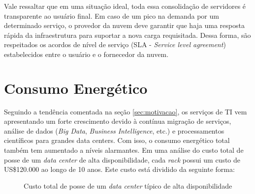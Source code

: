 Vale ressaltar que em uma situação ideal, toda essa consolidação de servidores
é transparente ao usuário final. Em caso de um pico na demanda por um determinado
serviço, o provedor da nuvem deve garantir que haja uma resposta rápida da 
infraestrutura para suportar a nova carga requisitada. Dessa forma, são 
respeitados os acordos de nível de serviço (SLA - \emph{Service level agreement})
estabelecidos entre o usuário e o fornecedor da nuvem.

\section{Consumo Energético}
\label{sec:consumo_energetico}

Seguindo a tendência comentada na seção \ref{sec:motivacao}, os serviços de TI
vem apresentando um forte crescimento devido à contínua migração de serviços,
análise de dados (\emph{Big Data}, \emph{Business Intelligence}, etc.) e
processamentos científicos para grandes data centers. Com isso, o consumo
energético total também tem aumentado a níveis alarmantes. Em uma análise do custo
total de posse de um \emph{data center} de alta disponibilidade, cada \emph{rack}
possui um custo de US\$120.000 ao longo de 10 anos. \cite{rasmussen:tco_data_center} 
Este custo está dividido da seguinte forma:

\newcommand{\slice}[4]{
  \pgfmathparse{0.5*#1+0.5*#2}
  \let\midangle\pgfmathresult

  \draw[thick,fill=black!10] (0,0) -- (#1:1) arc (#1:#2:1) -- cycle;

  \node[label=\midangle:#4] at (\midangle:1) {};

  \pgfmathparse{min((#2-#1-10)/110*(-0.3),0)}
  \let\temp\pgfmathresult
  \pgfmathparse{max(\temp,-0.5) + 0.8}
  \let\innerpos\pgfmathresult
  \node at (\midangle:\innerpos) {#3};
}

\begin{figure}
\centering
{}
\caption{Custo total de posse de um \emph{data center} típico de alta
disponibilidade \cite{rasmussen:tco_data_center}} \label{fig:tco_data_center}
\end{figure}

